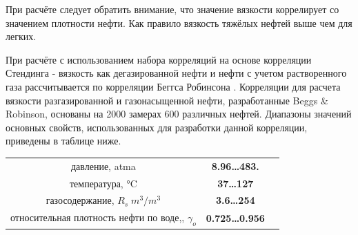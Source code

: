\documentclass[]{scrreprt}
\begin{document}
При расчёте следует обратить внимание, что значение вязкости коррелирует со значением плотности нефти. Как правило вязкость тяжёлых нефтей выше чем для легких.

При расчёте с использованием набора корреляций на основе корреляции Стендинга - вязкость как дегазированной нефти и нефти с учетом растворенного газа рассчитывается по корреляции Беггса Робинсона \cite{Yukos_PVT_2002}. 
Корреляции для расчета вязкости разгазированной и газонасыщенной нефти, разработанные Beggs \& Robinson, основаны на 2000 замерах 600 различных нефтей.
Диапазоны значений основных свойств, использованных для разработки данной корреляции, приведены в таблице ниже.
\begin{center}
	\begin{tabular}{ccc}
		давление, atma & \textbf{8.96…483.} \\
		температура, °C & \textbf{37…127}  \\
		газосодержание, $R_s \; m^3 /m^3$ & \textbf{3.6…254}\\
		относительная плотность нефти по воде,, $\gamma_o$ & \textbf{0.725…0.956} \\
	\end{tabular}
\end{center}
   

\newcommand{\MuDataFile}{data/Muo_P_data.txt}
\end{document}
